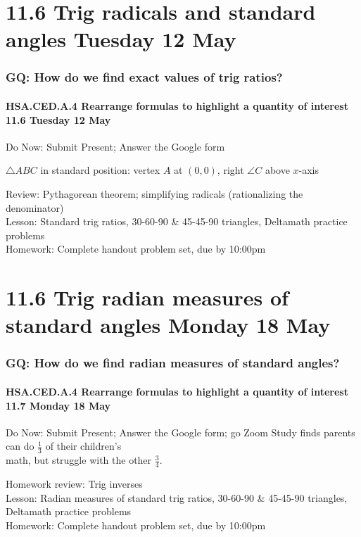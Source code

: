 \documentclass{beamer}
\begin{document}
\section{11.6 Trig radicals and standard angles Tuesday 12 May} 
\frame
{
  \frametitle{GQ: How do we find exact values of trig ratios?}
  \framesubtitle{HSA.CED.A.4 Rearrange formulas to highlight a quantity of interest \hfill \alert{11.6 Tuesday 12 May}}

  \begin{block}{Do Now: Submit Present; Answer the Google form} %
    \begin{multicols}{2}
      $\triangle ABC$ in standard position: vertex $A$ at $(0,0)$, right $\angle C$ above $x$-axis
    \end{multicols}
    \end{block}
  Review: Pythagorean theorem; simplifying radicals (rationalizing the denominator)\\[0.20cm]
  Lesson: Standard trig ratios, 30-60-90 \& 45-45-90 triangles,
  Deltamath practice problems \\[0.20cm]
  Homework: Complete handout problem set, due by 10:00pm
  }

  \section{11.6 Trig radian measures of standard angles Monday 18 May} 
  \frame
  {
    \frametitle{GQ: How do we find radian measures of standard angles?}
    \framesubtitle{HSA.CED.A.4 Rearrange formulas to highlight a quantity of interest \hfill \alert{11.7 Monday 18 May}}
  
    \begin{block}{Do Now: Submit Present; Answer the Google form; go Zoom} \vspace{0.5cm}
      \Large{
        Study finds parents can do $\frac{1}{3}$ of their children's \\[0.25cm] math, but struggle with the other $\frac{3}{4}$.
      }
      \end{block} \vspace{0.5cm}
      Homework review: Trig inverses \\[0.20cm]
      Lesson: Radian measures of standard trig ratios, 30-60-90 \& 45-45-90 triangles,
      Deltamath practice problems \\[0.20cm]
      Homework: Complete handout problem set, due by 10:00pm
  }
\end{document}
